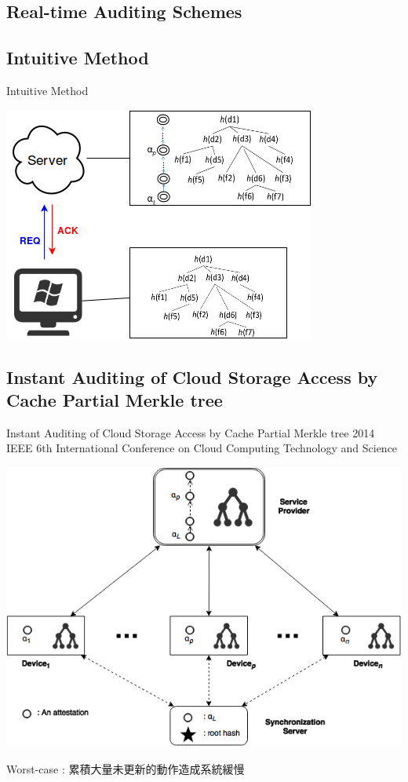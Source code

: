 \documentclass{beamer}
\begin{document}
\begin{CJK}{UTF8}{bkai}
\section{Real-time Auditing Schemes}
\subsection{\small{Intuitive Method}}
\begin{frame}{Intuitive Method}
	\begin{center}
	\includegraphics[width=.7\textwidth]{intuitive.png}
	\end{center}
\end{frame}

\subsection{\small{Instant Auditing of Cloud Storage Access by Cache Partial Merkle tree}}
\begin{frame}{\normalsize{Instant Auditing of Cloud Storage Access by Cache Partial Merkle tree}}
{\tiny{2014 IEEE 6th International Conference on Cloud Computing Technology and Science}}
	\begin{center}
	\includegraphics[width=.8\textwidth]{wei_shian.png}
	\end{center}
	\alert{Worst-case : 累積大量未更新的動作造成系統緩慢}
\end{frame}


\end{CJK}
\end{document}
